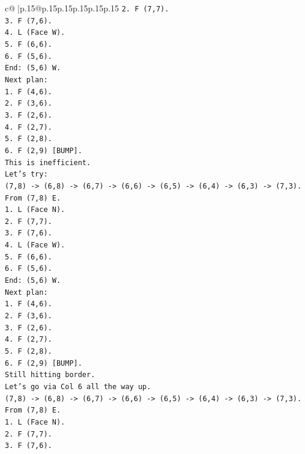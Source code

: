 \documentclass{article}
\begin{document}
{\begin{supertabular}{c@{$\;$}|p{.15\linewidth}@{}p{.15\linewidth}p{.15\linewidth}p{.15\linewidth}p{.15\linewidth}p{.15\linewidth}}
{{{\texttt{2. F (7,7).} \\
\texttt{3. F (7,6).} \\
\texttt{4. L (Face W).} \\
\texttt{5. F (6,6).} \\
\texttt{6. F (5,6).} \\
\texttt{End: (5,6) W.} \\
\texttt{Next plan:} \\
\texttt{1. F (4,6).} \\
\texttt{2. F (3,6).} \\
\texttt{3. F (2,6).} \\
\texttt{4. F (2,7).} \\
\texttt{5. F (2,8).} \\
\texttt{6. F (2,9) {[}BUMP{]}.} \\
\texttt{This is inefficient.} \\
\texttt{Let's try:} \\
\texttt{(7,8) {-}> (6,8) {-}> (6,7) {-}> (6,6) {-}> (6,5) {-}> (6,4) {-}> (6,3) {-}> (7,3).} \\
\texttt{From (7,8) E.} \\
\texttt{1. L (Face N).} \\
\texttt{2. F (7,7).} \\
\texttt{3. F (7,6).} \\
\texttt{4. L (Face W).} \\
\texttt{5. F (6,6).} \\
\texttt{6. F (5,6).} \\
\texttt{End: (5,6) W.} \\
\texttt{Next plan:} \\
\texttt{1. F (4,6).} \\
\texttt{2. F (3,6).} \\
\texttt{3. F (2,6).} \\
\texttt{4. F (2,7).} \\
\texttt{5. F (2,8).} \\
\texttt{6. F (2,9) {[}BUMP{]}.} \\
\texttt{Still hitting border.} \\
\texttt{Let's go via Col 6 all the way up.} \\
\texttt{(7,8) {-}> (6,8) {-}> (6,7) {-}> (6,6) {-}> (6,5) {-}> (6,4) {-}> (6,3) {-}> (7,3).} \\
\texttt{From (7,8) E.} \\
\texttt{1. L (Face N).} \\
\texttt{2. F (7,7).} \\
\texttt{3. F (7,6).} \\
}}}
\end{supertabular}}
\end{document}
